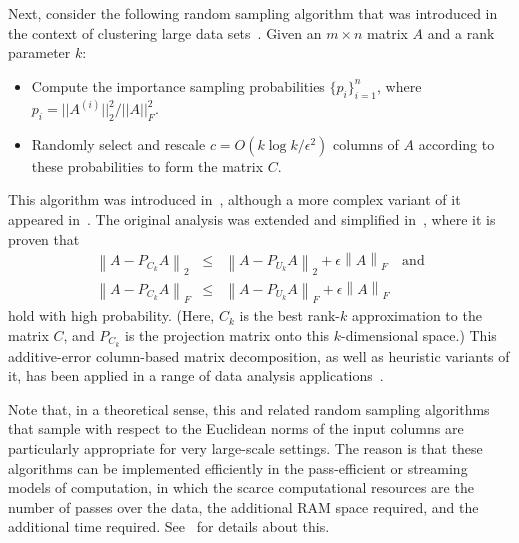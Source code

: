 \documentclass[twoside]{article}
\newcommand{\TNorm }[1]{\mbox{}\left\|#1\right\|_2  }
\newcommand{\FNorm }[1]{\mbox{}\left\|#1\right\|_F  }
\begin{document}
Next, consider the following random sampling algorithm that was 
introduced in the context of clustering large data sets~\cite{DFKVV04_JRNL}.
Given an $m \times n$ matrix $A$ and a rank parameter $k$:
\begin{itemize}
\item
Compute the importance sampling probabilities $\{p_i\}_{i=1}^{n}$, where 
$p_i=||A^{(i)}||_2^2/||A||_F^2$.
\item
Randomly select and rescale $c = O(k \log k /\epsilon^2)$ columns of $A$
according to these probabilities to form the matrix $C$.
\end{itemize}
This algorithm was introduced in~\cite{DFKVV04_JRNL}, although a more 
complex variant of it appeared in~\cite{FKV04}.
The original analysis was extended and simplified in~\cite{dkm_matrix2}, 
where it is proven that
\begin{eqnarray}
\label{eqn:sample-add-err-2}
\TNorm{A-P_{C_k}A} &\le& \TNorm{A-P_{U_k}A } + \epsilon \FNorm{A}  \quad\mbox{and} \\
\FNorm{A-P_{C_k}A} &\le& \FNorm{A-P_{U_k}A } + \epsilon \FNorm{A}
\label{eqn:sample-add-err-F}
\end{eqnarray}
hold with high probability.
(Here, $C_k$ is the best rank-$k$ approximation to the matrix $C$, and 
$P_{C_k}$ is the projection matrix onto this $k$-dimensional space.)
This additive-error column-based matrix decomposition, as well as heuristic 
variants of it, has been applied in a range of data analysis 
applications~\cite{MMD06,Paschou07a,SXZF07_cmdmatrix,TPSYF08,PZW08}. 

Note that, in a theoretical sense, this and related random sampling 
algorithms that sample with respect to the Euclidean norms of the input 
columns are particularly appropriate for very large-scale settings.  
The reason is that these algorithms can be implemented efficiently in the
pass-efficient or streaming models of computation, in which 
the scarce computational resources are the number of passes over the data, 
the additional RAM space required, and the additional time required. 
See~\cite{dkm_matrix1,dkm_matrix2} for details about this.
\end{document}
